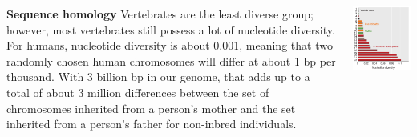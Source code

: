\documentclass[11pt,dvipsnames,ignorenonframetext,aspectratio=169]{beamer}
\begin{document}
\begin{frame}{}
\protect\hypertarget{section-3}{}
\begin{columns}[T,onlytextwidth]

\textbf{Sequence homology}
\footnotesize
Vertebrates are the least diverse group; however, most vertebrates still possess a lot of nucleotide diversity. For humans, nucleotide diversity is about 0.001, meaning that two randomly chosen human chromosomes will differ at about 1 bp per thousand. With 3 billion bp in our genome, that adds up to a total of about 3 million differences between the set of chromosomes inherited from a person's mother and the set inherited from a person's father for non-inbred individuals.


\begin{center}\includegraphics[width=0.42\linewidth]{../images/nucleotide_diversity_organisms} \end{center}



\end{columns}
\end{frame}
\end{document}
